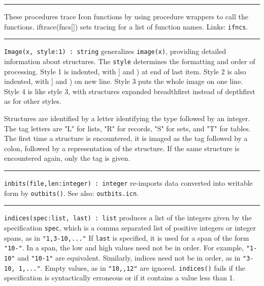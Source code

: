 \vspace{0.25cm}\hrule{}

These procedures trace Icon functions by using procedure
wrappers to call the functions. iftrace(fncs[]) sets tracing for a list
of function names. Links: \texttt{ifncs}.

\vspace{0.25cm}\hrule{}

\texttt{Image(x, style:1) : string} generalizes
\texttt{image(x)}, providing detailed information about structures. The
\texttt{style} determines the formatting and order of
processing. Style 1 is indented, with ] and ) at end of last item.
Style 2 is also indented, with ] and ) on new line. Style 3 puts the
whole image on one line. Style 4 is like style 3, with structures
expanded breadthfirst instead of depthfirst as for other styles.

Structures are identified by a letter identifying the type followed by
an integer. The tag letters are "L" for
lists, "R" for records,
"S" for sets, and
"T" for tables. The first time a structure
is encountered, it is imaged as the tag followed by a colon, followed
by a representation of the structure. If the same structure is
encountered again, only the tag is given.

\vspace{0.25cm}\hrule{}

\texttt{inbits(file,len:integer) : integer} re-imports data converted
into writable form by \texttt{outbits()}. See also:
\texttt{outbits.icn}.

\vspace{0.25cm}\hrule{}

\texttt{indices(spec:list, last) : list} produces a list of the integers
given by the specification \texttt{spec}, which is a comma separated
list of positive integers or integer spans, as in
\texttt{"1,3-10,..."} If \texttt{last} is
specified, it is used for a span of the form
\texttt{"10-"}. In a span, the low and high
values need not be in order. For example,
\texttt{"1-10"} and
\texttt{"10-1"} are equivalent. Similarly,
indices need not be in order, as in \texttt{"3-10,
1,..."}. Empty values, as in
\texttt{"10,,12"} are ignored.
\texttt{indices()} fails if the specification is syntactically
erroneous or if it contains a value less than 1. 

